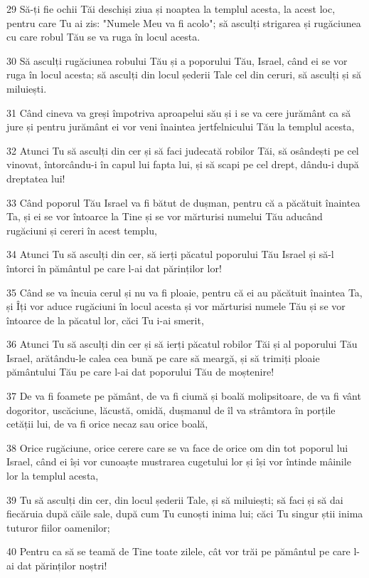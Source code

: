 \par 29 Să-ți fie ochii Tăi deschiși ziua și noaptea la templul acesta, la acest loc, pentru care Tu ai zis: "Numele Meu va fi acolo"; să asculți strigarea și rugăciunea cu care robul Tău se va ruga în locul acesta.
\par 30 Să asculți rugăciunea robului Tău și a poporului Tău, Israel, când ei se vor ruga în locul acesta; să asculți din locul șederii Tale cel din ceruri, să asculți și să miluiești.
\par 31 Când cineva va greși împotriva aproapelui său și i se va cere jurământ ca să jure și pentru jurământ ei vor veni înaintea jertfelnicului Tău la templul acesta,
\par 32 Atunci Tu să asculți din cer și să faci judecată robilor Tăi, să osândești pe cel vinovat, întorcându-i în capul lui fapta lui, și să scapi pe cel drept, dându-i după dreptatea lui!
\par 33 Când poporul Tău Israel va fi bătut de dușman, pentru că a păcătuit înaintea Ta, și ei se vor întoarce la Tine și se vor mărturisi numelui Tău aducând rugăciuni și cereri în acest templu,
\par 34 Atunci Tu să asculți din cer, să ierți păcatul poporului Tău Israel și să-l întorci în pământul pe care l-ai dat părinților lor!
\par 35 Când se va încuia cerul și nu va fi ploaie, pentru că ei au păcătuit înaintea Ta, și Îți vor aduce rugăciuni în locul acesta și vor mărturisi numele Tău și se vor întoarce de la păcatul lor, căci Tu i-ai smerit,
\par 36 Atunci Tu să asculți din cer și să ierți păcatul robilor Tăi și al poporului Tău Israel, arătându-le calea cea bună pe care să meargă, și să trimiți ploaie pământului Tău pe care l-ai dat poporului Tău de moștenire!
\par 37 De va fi foamete pe pământ, de va fi ciumă și boală molipsitoare, de va fi vânt dogoritor, uscăciune, lăcustă, omidă, dușmanul de îl va strâmtora în porțile cetății lui, de va fi orice necaz sau orice boală,
\par 38 Orice rugăciune, orice cerere care se va face de orice om din tot poporul lui Israel, când ei își vor cunoaște mustrarea cugetului lor și își vor întinde mâinile lor la templul acesta,
\par 39 Tu să asculți din cer, din locul șederii Tale, și să miluiești; să faci și să dai fiecăruia după căile sale, după cum Tu cunoști inima lui; căci Tu singur știi inima tuturor fiilor oamenilor;
\par 40 Pentru ca să se teamă de Tine toate zilele, cât vor trăi pe pământul pe care l-ai dat părinților noștri!
